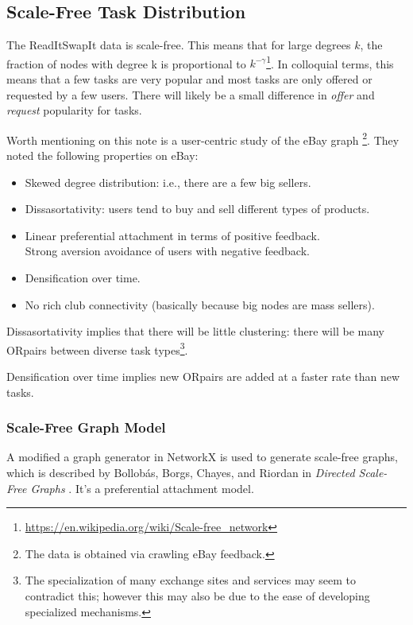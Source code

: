 \documentclass[main.tex]{subfiles}
\begin{document}
\subsection{Scale-Free Task Distribution}
The ReadItSwapIt data is scale-free. This means that for large degrees $k$, the fraction of nodes with degree k is proportional to $k^{-\gamma}$\footnote{\url{https://en.wikipedia.org/wiki/Scale-free_network}}. In colloquial terms, this means that a few tasks are very popular and most tasks are only offered or requested by a few users. There will likely be a small difference in \textit{offer} and \textit{request} popularity for tasks.

Worth mentioning on this note is a user-centric study of the eBay graph \cite{ebay}\footnote{The data is obtained via crawling eBay feedback.}. They noted the following properties on eBay:

\begin{itemize}
  \item Skewed degree distribution: i.e., there are a few big sellers.
  \item Dissasortativity: users tend to buy and sell different types of products.
  \item Linear preferential attachment in terms of positive feedback.
     \\ Strong aversion avoidance of users with negative feedback.
  \item Densification over time.
  \item No rich club connectivity (basically because big nodes are mass sellers).
\end{itemize}

Dissasortativity implies that there will be little clustering: there will be many ORpairs between diverse task types\footnote{The specialization of many exchange sites and services may seem to contradict this; however this may also be due to the ease of developing specialized mechanisms.}.

Densification over time implies new ORpairs are added at a faster rate than new tasks.

\subsubsection{Scale-Free Graph Model}
A modified a graph generator in NetworkX \cite{netX} is used to generate scale-free graphs, which is described by Bollobás, Borgs, Chayes, and Riordan in \textit{Directed Scale-Free Graphs} \cite{Bol}. It's a preferential attachment model.
\end{document}
